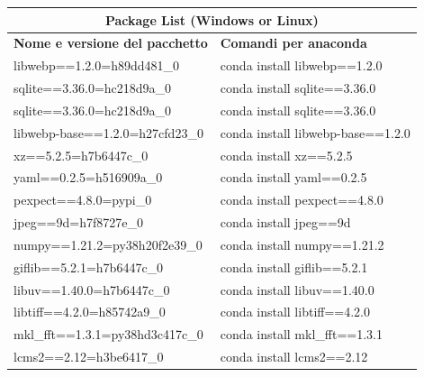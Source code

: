 \begin{tabular}{ |p{8cm}||p{8cm}|  }



\hline
\multicolumn{2}{|c|}{Package List (Windows or Linux)} \\
\hline

\textbf{Nome e versione del pacchetto}& \textbf{Comandi per anaconda}\\
\hline

libwebp==1.2.0=h89dd481\_0&conda install libwebp==1.2.0  \\

\hline

sqlite==3.36.0=hc218d9a\_0&conda install sqlite==3.36.0\\

\hline

  sqlite==3.36.0=hc218d9a\_0&	conda install sqlite==3.36.0\\
\hline

libwebp-base==1.2.0=h27cfd23\_0&conda install libwebp-base==1.2.0\\
\hline

  xz==5.2.5=h7b6447c\_0&	conda install xz==5.2.5\\
\hline

  yaml==0.2.5=h516909a\_0&	conda install yaml==0.2.5\\
\hline

  pexpect==4.8.0=pypi\_0&	conda install pexpect==4.8.0\\
\hline


  jpeg==9d=h7f8727e\_0&	conda install jpeg==9d\\
\hline


  numpy==1.21.2=py38h20f2e39\_0&	conda install numpy==1.21.2\\
\hline



  giflib==5.2.1=h7b6447c\_0&conda install giflib==5.2.1\\
\hline


  libuv==1.40.0=h7b6447c\_0&	conda install libuv==1.40.0\\
\hline



  libtiff==4.2.0=h85742a9\_0&	conda install libtiff==4.2.0\\
\hline


  mkl\_fft==1.3.1=py38hd3c417c\_0&	conda install mkl\_fft==1.3.1\\
\hline


  lcms2==2.12=h3be6417\_0&	conda install lcms2==2.12\\
\hline



\end{tabular}
